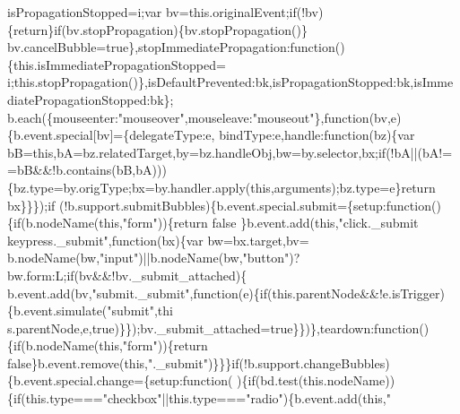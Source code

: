 \begin{DoxyCode}
      isPropagationStopped=i;var bv=this.originalEvent;\textcolor{keywordflow}{if}(!bv)\{\textcolor{keywordflow}{return}\}\textcolor{keywordflow}{if}(bv.stopPropagation)\{bv.stopPropagation()\}
      bv.cancelBubble=\textcolor{keyword}{true}\},stopImmediatePropagation:\textcolor{keyword}{function}()\{this.isImmediatePropagationStopped=
      i;this.stopPropagation()\},isDefaultPrevented:bk,isPropagationStopped:bk,isImmediatePropagationStopped:bk\};
      b.each(\{mouseenter:\textcolor{stringliteral}{"mouseover"},mouseleave:\textcolor{stringliteral}{"mouseout"}\},\textcolor{keyword}{function}(bv,e)\{b.event.special[bv]=\{delegateType:e,
      bindType:e,handle:\textcolor{keyword}{function}(bz)\{var bB=\textcolor{keyword}{this},bA=bz.relatedTarget,by=bz.handleObj,bw=by.selector,bx;\textcolor{keywordflow}{if}(!bA||(bA!=
      =bB&&!b.contains(bB,bA)))\{bz.type=by.origType;bx=by.handler.apply(\textcolor{keyword}{this},arguments);bz.type=e\}\textcolor{keywordflow}{return} bx\}\}\});\textcolor{keywordflow}{if}
      (!b.support.submitBubbles)\{b.event.special.submit=\{setup:\textcolor{keyword}{function}()\{\textcolor{keywordflow}{if}(b.nodeName(\textcolor{keyword}{this},\textcolor{stringliteral}{"form"}))\{\textcolor{keywordflow}{return} \textcolor{keyword}{false}
      \}b.event.add(\textcolor{keyword}{this},\textcolor{stringliteral}{"click.\_submit keypress.\_submit"},\textcolor{keyword}{function}(bx)\{var bw=bx.target,bv=
      b.nodeName(bw,\textcolor{stringliteral}{"input"})||b.nodeName(bw,\textcolor{stringliteral}{"button"})?bw.form:L;\textcolor{keywordflow}{if}(bv&&!bv.\_submit\_attached)\{
      b.event.add(bv,\textcolor{stringliteral}{"submit.\_submit"},\textcolor{keyword}{function}(e)\{\textcolor{keywordflow}{if}(this.parentNode&&!e.isTrigger)\{b.event.simulate(\textcolor{stringliteral}{"submit"},thi
      s.parentNode,e,true)\}\});bv.\_submit\_attached=\textcolor{keyword}{true}\}\})\},teardown:\textcolor{keyword}{function}()\{\textcolor{keywordflow}{if}(b.nodeName(\textcolor{keyword}{this},\textcolor{stringliteral}{"form"}))\{\textcolor{keywordflow}{return} \textcolor{keyword}{
      false}\}b.event.remove(\textcolor{keyword}{this},\textcolor{stringliteral}{".\_submit"})\}\}\}\textcolor{keywordflow}{if}(!b.support.changeBubbles)\{b.event.special.change=\{setup:\textcolor{keyword}{function}(
      )\{\textcolor{keywordflow}{if}(bd.test(\textcolor{keyword}{this}.nodeName))\{\textcolor{keywordflow}{if}(this.type===\textcolor{stringliteral}{"checkbox"}||this.type===\textcolor{stringliteral}{"radio"})\{b.event.add(\textcolor{keyword}{this},\textcolor{stringliteral}{"
}
\end{DoxyCode}
